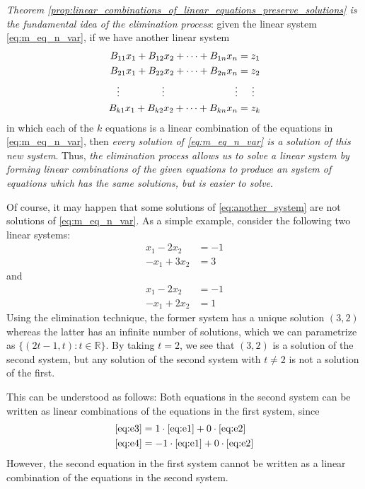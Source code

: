 \documentclass[12pt,letterpaper,reqno]{article}
\numberwithin{equation}{section}
\begin{document}
\emph{Theorem \ref{prop:linear_combinations_of_linear_equations_preserve_solutions} is the fundamental idea of the elimination process}: given the linear system \eqref{eq:m_eq_n_var}, if we have another linear system 
	\begin{equation}\label{eq:another_system}
\begin{split}
	B_{11}x_1+B_{12}x_2+\cdots + B_{1n}x_n &=z_1 \\
	B_{21}x_1+B_{22}x_2+\cdots + B_{2n}x_n &=z_2 \\
	\vdots \hspace{1.5cm} \vdots \hspace{2.5cm} \vdots & \hspace{0.5cm}\vdots  \\
	B_{k1}x_1+B_{k2}x_2+\cdots + B_{kn}x_n &=z_k \\
\end{split}
\end{equation}
in which each of the $k$ equations is a linear combination of the equations in \eqref{eq:m_eq_n_var}, then \emph{every solution of \eqref{eq:m_eq_n_var} is a solution of this new system}. 
Thus, \emph{the elimination process allows us to solve a linear system by forming linear combinations of the given equations to produce an system of equations which has the same solutions, but is easier to solve}. 

Of course, it may happen that some solutions of \eqref{eq:another_system} are not solutions of \eqref{eq:m_eq_n_var}. As a simple example, consider the following two linear systems:
\begin{align}
		x_1-2x_2&=-1 \label{eq:e1}\\
		-x_1+3x_2&=3 \label{eq:e2}
\end{align} 
and 
\begin{align}
		x_1-2x_2&=-1 \label{eq:e3}\\
		-x_1+2x_2&=1 \label{eq:e4}
\end{align}
Using the elimination technique, the former system has a unique solution $(3,2)$ whereas the latter has an infinite number of solutions, which we can parametrize as $\{(2t-1,t):t \in \mathbb{R}\}$. By taking $t=2$, we see that $(3,2)$ is a solution of the second system, but any solution of the second system with $t \neq 2$ is not a solution of the first.

This can be understood as follows: Both equations in the second system can be written as linear combinations of the equations in the first system, since 
\begin{align*}
	\eqref{eq:e3}&=1\cdot \eqref{eq:e1}+0\cdot \eqref{eq:e2} \\
	\eqref{eq:e4}&=-1\cdot \eqref{eq:e1}+0\cdot \eqref{eq:e2}
\end{align*}
However, the second equation in the first system  cannot be written as a linear combination of the equations in the second system.
\end{document}
